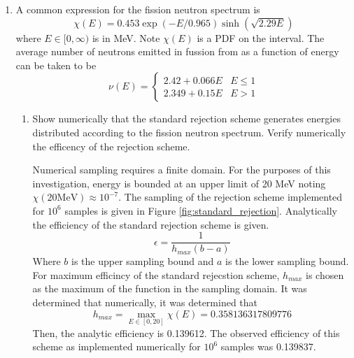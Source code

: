 \documentclass{article}
\begin{document}
\begin{enumerate}
  \item A common expression for the fission neutron spectrum is 
    \begin{equation}
      \chi(E) = 0.453 \exp(-E/0.965) \sinh\left(\sqrt{2.29E}\right)
    \end{equation}
    where $E \in [0,\infty)$ is in MeV. Note $\chi(E)$ is a PDF on the
    interval. The average number of neutrons emitted in fussion from 
     as a function of energy can be taken to be
    \begin{equation}
      \nu(E) = 
      \begin{cases}
        2.42 + 0.066 E & E \le 1 \\
        2.349 + 0.15 E & E >   1
      \end{cases}
    \end{equation}
    \begin{enumerate}
      \item Show numerically that the standard rejection scheme generates
        energies distributed according to the fission neutron spectrum. Verify
        numerically the efficency of the rejection scheme.

        Numerical sampling requires a finite domain. For the purposes of this
        investigation, energy is bounded at an upper limit of 20 MeV noting
        $\chi(20 \text{MeV}) \approx 10^{-7}$. 
        The sampling of the rejection scheme implemented for $10^6$ samples is
        given in Figure \ref{fig:standard_rejection}. Analytically the
        efficiency of the standard rejection scheme is given.
        \begin{equation} \label{eq:standard_efficiency}
          \epsilon = \frac{1}{h_{max} (b-a)}
        \end{equation}
        Where $b$ is the upper sampling bound and $a$ is the lower sampling
        bound. For maximum efficincy of the standard rejecstion scheme,
        $h_{max}$ is chosen as the maximum of the function in the sampling
        domain. It was determined that numerically, it was determined that
        \begin{equation}
          h_{max} = \max_{E \in [0,20]} \chi(E) = 0.358136317809776
        \end{equation}
        Then, the analytic efficiency is 0.139612. The observed efficiency of
        this scheme as implemented numerically for $10^6$ samples was 0.139837.


\end{enumerate}
\end{enumerate}
\end{document}
